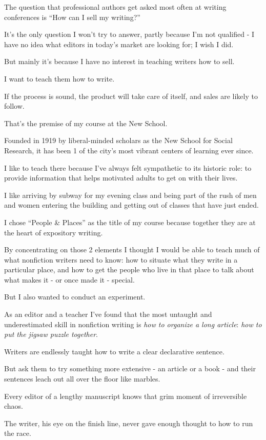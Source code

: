 \documentclass{book}
\numberwithin{equation}{section}
\begin{document}
The question that professional authors get asked most often at writing conferences is ``How can I sell my writing?''

It's the only question I won't try to answer, partly because I'm not qualified - I have no idea what editors in today's market are looking for; I wish I did.

But mainly it's because I have no interest in teaching writers how to sell.

I want to teach them how to write.

If the process is sound, the product will take care of itself, and sales are likely to follow.

%
That's the premise of my course at the New School.

Founded in 1919 by liberal-minded scholars as the New School for Social Research, it has been 1 of the city's most vibrant centers of learning ever since.

I like to teach there because I've always felt sympathetic to its historic role: to provide information that helps motivated adults to get on with their lives.

I like arriving by subway for my evening class and being part of the rush of men and women entering the building and getting out of classes that have just ended.

%
I chose ``People \& Places'' as the title of my course because together they are at the heart of expository writing.

By concentrating on those 2 elements I thought I would be able to teach much of what nonfiction writers need to know: how to situate what they write in a particular place, and how to get the people who live in that place to talk about what makes it - or once made it - special.

%
But I also wanted to conduct an experiment.

As an editor and a teacher I've found that the most untaught and underestimated skill in nonfiction writing is \textit{how to organize a long article}: \textit{how to put the jigsaw puzzle together}.

Writers are endlessly taught how to write a clear declarative sentence.

But ask them to try something more extensive - an article or a book - and their sentences leach out all over the floor like marbles.

Every editor of a lengthy manuscript knows that grim moment of irreversible chaos.

The writer, his eye on the finish line, never gave enough thought to how to run the race.
\end{document}
